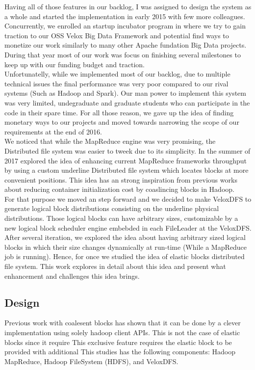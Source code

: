 Having all of those features in our backlog, I was assigned to design the system as a whole and started the implementation in early 2015 with few more colleagues. Concurrently, we enrolled an startup incubator program in where we try to gain traction to our OSS Velox Big Data Framework and potential find ways to monetize our work similarly to many other Apache fundation Big Data projects. \\
During that year most of our work was focus on finishing several milestones to keep up with our funding budget and traction. \\

Unfortunatelly, while we implemented most of our backlog, due to multiple technical issues the final performance was very poor compared to our rival systems (Such as Hadoop and Spark). Our man power to implement this system was very limited, undegraduate and graduate students who can participate in the code in their spare time. For all those reason, we gave up the idea of finding monetary ways to our projects and moved towards narrowing the scope of our requirements at the end of 2016. \\

We noticed that while the MapReduce engine was very promising, the Distributed file system was easier to tweek due to its simplicity. In the summer of 2017 explored the idea of enhancing current MapReduce frameworks throughput by using a custom underline Distributed file system which locates blocks at more convenient positions. This idea has an strong inspiration from previous works about reducing container initialization cost by coaslincing blocks in Hadoop. \\

For that purpose we moved an step forward and we decided to make VeloxDFS to generate logical block distributions consisting on the underline physical distributions. Those logical blocks can have arbitrary sizes, customizable by a new logical block scheduler engine embebded in each FileLeader at the VeloxDFS. \\

After several iteration, we explored the idea about having arbitrary sized logical blocks in which their size changes dynamically at run-time (While a MapReduce job is running). Hence, for once we studied the idea of elastic blocks distributed file system. This work explores in detail about this idea and present what enhancement and challenges this idea brings.


\subsection{Design}
Previous work with coalesent blocks has shown that it can be done by a clever implementation using solely hadoop client APIs. This is not the case of elastic blocks since it require
This exclusive feature requires the elastic block to be provided with additional
This studies has the following components: Hadoop MapReduce, Hadoop FileSystem (HDFS), and VeloxDFS. 

